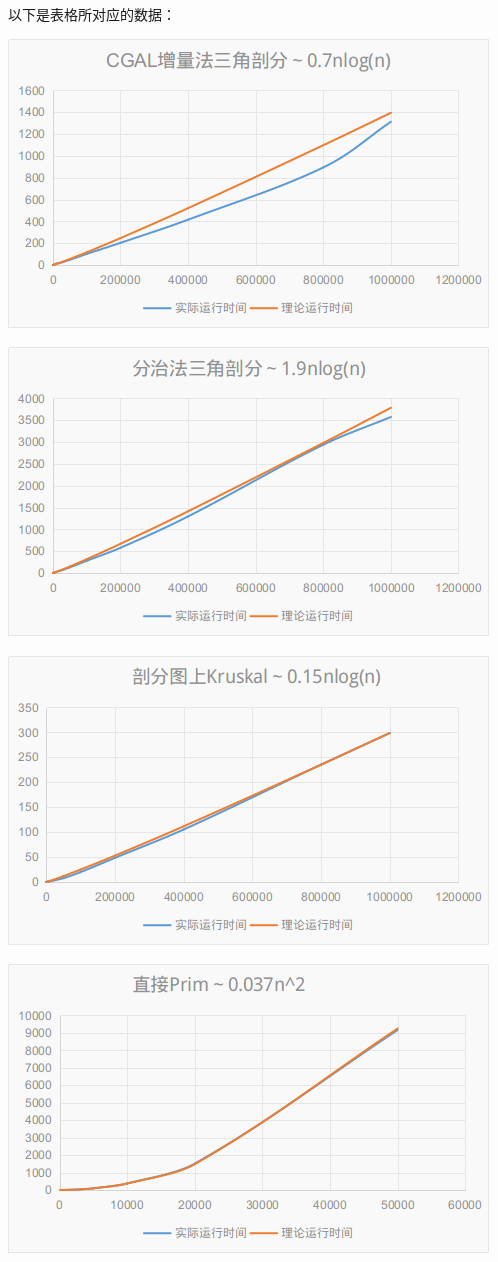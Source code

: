 \documentclass[a4paper]{article}
\begin{document}
以下是表格所对应的数据：\\
\begin{center}
\includegraphics[width=0.9\linewidth]{runtime1.png}

\includegraphics[width=0.9\linewidth]{runtime2.png}

\includegraphics[width=0.9\linewidth]{runtime3.png}

\includegraphics[width=0.9\linewidth]{runtime4.png}	
\end{center}
\end{document}
